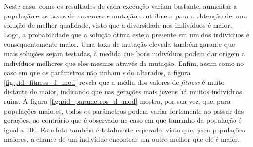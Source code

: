 \begin {enumerate}
	\FloatBarrier
	
	Neste caso, como os resultados de cada execução variam bastante, aumentar a
	população e as taxas de \textit{crossover} e mutação contribuem para a obtenção
	de uma solução de melhor qualidade, visto que a diversidade nos indivíduos é
	maior. Logo, a probabilidade que a solução ótima esteja presente em um dos
	indivíduos é consequentemente maior. Uma taxa de mutação elevada também garante
	que mais soluções sejam testadas, à medida que bons indivíduos podem dar origem
	a indivíduos melhores que eles mesmos através da mutação. Enfim, assim como no
	caso em que os parâmetros não tinham sido alterados, a figura
	\ref{fig:pid_fitness_d_mod} revela que a média dos valores de \textit{fitness}
	é muito distante do maior, indicando que nas gerações mais jovens há muitos
	indivíduos ruins. A figura \ref{fig:pid_parametros_d_mod} mostra, por sua vez,
	que, para populações maiores, todos os parâmetros podem variar fortemente
	ao passar das gerações, ao contrário que é observado no caso em que tamanho da
	população é igual a 100. Este fato também é totalmente esperado, visto que,
	para populações maiores, a chance de um indivíduo encontrar um outro melhor que ele
	é maior.
	
\end{enumerate}